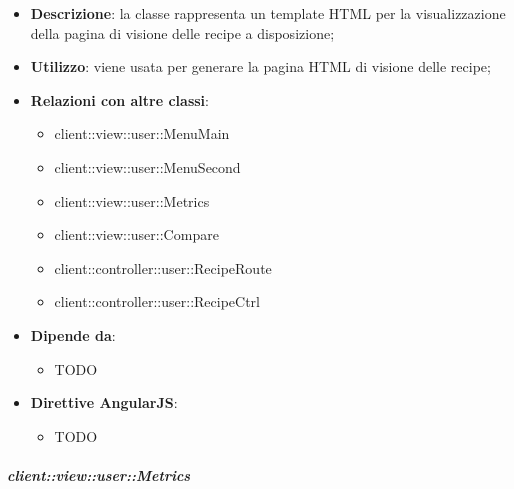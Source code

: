 			\begin{itemize}
				\item \textbf{Descrizione}: la classe rappresenta un template HTML per la visualizzazione della pagina di visione delle recipe a disposizione;
				\item \textbf{Utilizzo}: viene usata per generare la pagina HTML di visione delle recipe;
				\item \textbf{Relazioni con altre classi}:
					\begin{itemize}
						\item client::view::user::MenuMain
						\item client::view::user::MenuSecond
						\item client::view::user::Metrics
						\item client::view::user::Compare
						\item client::controller::user::RecipeRoute
						\item client::controller::user::RecipeCtrl
					\end{itemize}
				\item \textbf{Dipende da}:
					\begin{itemize}
						\item TODO
					\end{itemize}
				\item \textbf{Direttive AngularJS}:
					\begin{itemize}
						\item TODO
					\end{itemize}
			\end{itemize}

		\subparagraph{client::view::user::Metrics} %
		\label{subp:bdsm_app_client_view_metrics}

